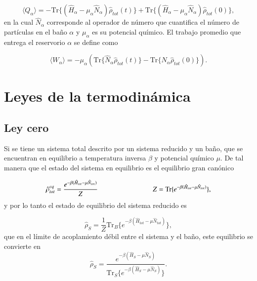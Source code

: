 \begin{equation}
    \langle Q_{\alpha}\rangle = - \text{Tr}\{(\hat{H}_{\alpha} - \mu_{\alpha}\hat{N}_{\alpha})\hat{\rho}_{tot}(t) \} + \text{Tr}\{(\hat{H}_{\alpha} - \mu_{\alpha}\hat{N}_{\alpha})\hat{\rho}_{tot}(0) \},
\label{sec3:calor}
\end{equation}
en la cual $\hat{N}_{\alpha}$ corresponde al operador de número que cuantifica el número de partículas en el baño $\alpha$ y $\mu_{\alpha}$ es su potencial químico. El trabajo promedio que entrega el reservorio $\alpha$ se define como

\begin{equation}
    \langle W_{\alpha}\rangle = - \mu_{\alpha} (\text{Tr}\{\hat{N}_{\alpha} \hat{\rho}_{tot}(t) \} - \text{Tr}\{\hat{N}_{\alpha}\hat{\rho}_{tot}(0) \}  ).
    \label{sec3:trabajo}
\end{equation}
\label{sec3workheat}

\newpage

\section{Leyes de la termodinámica}
\label{Leyestermo}
\subsection{Ley cero}
Si se tiene un sistema total descrito por un sistema reducido y un baño, que se encuentran en equilibrio a temperatura inversa $\beta$ y potencial químico $\mu$. De tal manera que el estado del sistema en equilibrio es el equilibrio gran canónico

\begin{equation*}
    \hat{\rho}^{eq}_{tot} = \frac{e^{-\beta(\hat{H}_{tot} - \mu \hat{N}_{tot})}}{Z}  \hspace{28mm} Z = \text{Tr}\{e^{-\beta(\hat{H}_{tot} - \mu \hat{N}_{tot})} \},
\end{equation*}
y por lo tanto el estado de equilibrio del sistema reducido es

\begin{equation*}
    \hat{\rho}_{S} = \frac{1}{Z}\text{Tr}_{B}\{ e^{-\beta(\hat{H}_{tot} - \mu \hat{N}_{tot})} \},
\end{equation*}
que en el límite de acoplamiento débil entre el sistema y el baño, este equilibrio se convierte en \cite{geva2000second}
\begin{equation*}
    \hat{\rho}_{S} = \frac{e^{-\beta(\hat{H}_{S} - \mu\hat{N}_{S})}}{\text{Tr}_{S}\{e^{-\beta(\hat{H}_{S} - \mu \hat{N}_{S})} \} }.
\end{equation*}

